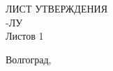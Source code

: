 {\begin{center}
    \vspace{8mm}
    ЛИСТ УТВЕРЖДЕНИЯ\\
    \VSTULUCode-ЛУ\\
    Листов 1\\
    \vspace{\fill}
    \end{center}
    \begin{flushright}
    \VSTUTitleDirector
    \vfill
    \VSTUTitleImplementer
    \end{flushright}
    \vspace{\fill}
    \begin{center}
    Волгоград,~\the\year
    \end{center}
    \clearpage
    \pagestyle{plainhf}
}
